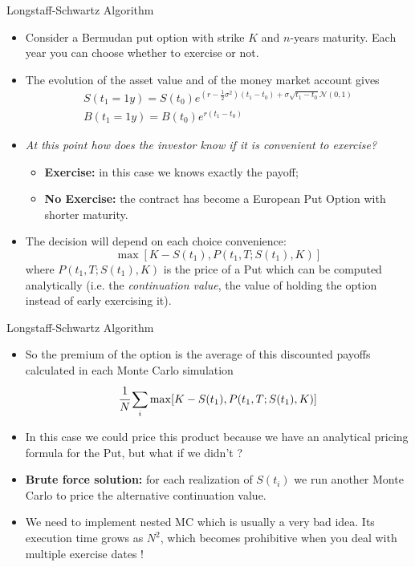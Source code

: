 \documentclass{beamer}
\begin{document}
\begin{frame}{Longstaff-Schwartz Algorithm}
\begin{itemize}
    \item Consider a Bermudan put option with strike $K$ and $n$-years maturity. Each year you can choose whether to exercise or not.
    \item The evolution of the asset value and of the money market account gives
    \begin{equation}
	\begin{gathered}
		S(t_1=1y) = S(t_0)e^{(r-\frac{1}{2}\sigma^2)(t_1-t_0)+\sigma\sqrt{t_1-t_0}\mathcal{N}(0,1)} \\
		B(t_1=1y)=B(t_0)e^{r(t_1-t_0)}
	\end{gathered}
    \end{equation}
    \item \emph{At this point how does the investor know if it is convenient to exercise?}
    \begin{itemize}
        \item \textbf{Exercise:} in this case we knows exactly the payoff;
        \item \textbf{No Exercise:} the contract has become a European Put Option with shorter maturity.
    \end{itemize}
    \item The decision will depend on each choice convenience:
    \begin{equation*}
\max[K-S(t_1), P(t_1,T;S(t_1),K)]
    \end{equation*}
where $P(t_1,T;S(t_1),K)$ is the price of a Put which can be computed analytically (i.e. the \emph{continuation value}, the value of holding the option instead of early exercising it).
\end{itemize}
\end{frame}

\begin{frame}{Longstaff-Schwartz Algorithm}
\begin{itemize}
    \item So the premium of the option is the average of this discounted payoffs calculated in each Monte Carlo simulation
\begin{equation*}
	\cfrac{1}{N}\sum_i\max[K-S(t_1), P(t_1,T;S(t_1),K)]
\end{equation*}
    \item In this case we could price this product because we have an analytical pricing formula for the Put, but what if we didn't ?
    \item \textbf{Brute force solution:} for each realization of $S(t_i)$ we run another Monte Carlo to price the alternative continuation value.
    \item We need to implement nested MC which is usually a very bad idea. Its execution time grows as $N^2$, which becomes prohibitive when you deal with multiple exercise dates !
\end{itemize}    
\end{frame}
\end{document}

